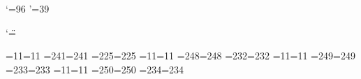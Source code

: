 




\chardef\lq=96 \chardef\rq=39


\catcode`\"=\dblcode		%




=11=11	%
=241=241
=225=225
=11=11	%
=248=248
=232=232
=11=11	%
=249=249
=233=233
=11=11	%
=250=250
=234=234

\endinput




